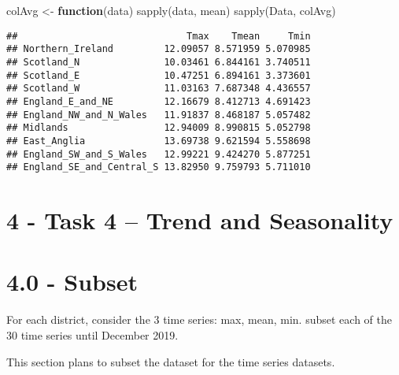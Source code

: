 \documentclass[
]{article}
\newenvironment{Shaded}{\begin{snugshade}}{\end{snugshade}}
\newcommand{\ControlFlowTok}[1]{\textcolor[rgb]{0.13,0.29,0.53}{\textbf{#1}}}
\newcommand{\FunctionTok}[1]{\textcolor[rgb]{0.00,0.00,0.00}{#1}}
\newcommand{\NormalTok}[1]{#1}
\newcommand{\OtherTok}[1]{\textcolor[rgb]{0.56,0.35,0.01}{#1}}
\begin{document}
\begin{Shaded}
\begin{Highlighting}[]
\NormalTok{colAvg }\OtherTok{\textless{}{-}} \ControlFlowTok{function}\NormalTok{(data) }\FunctionTok{sapply}\NormalTok{(data, mean)}
\FunctionTok{sapply}\NormalTok{(Data, colAvg)}
\end{Highlighting}
\end{Shaded}

\begin{verbatim}
##                              Tmax    Tmean     Tmin
## Northern_Ireland         12.09057 8.571959 5.070985
## Scotland_N               10.03461 6.844161 3.740511
## Scotland_E               10.47251 6.894161 3.373601
## Scotland_W               11.03163 7.687348 4.436557
## England_E_and_NE         12.16679 8.412713 4.691423
## England_NW_and_N_Wales   11.91837 8.468187 5.057482
## Midlands                 12.94009 8.990815 5.052798
## East_Anglia              13.69738 9.621594 5.558698
## England_SW_and_S_Wales   12.99221 9.424270 5.877251
## England_SE_and_Central_S 13.82950 9.759793 5.711010
\end{verbatim}

\hypertarget{task-4-trend-and-seasonality}{%
\section{4 - Task 4 -- Trend and
Seasonality}\label{task-4-trend-and-seasonality}}

\hypertarget{subset}{%
\section{4.0 - Subset}\label{subset}}

For each district, consider the 3 time series: max, mean, min. subset
each of the 30 time series until December 2019.

This section plans to subset the dataset for the time series datasets.
\end{document}
